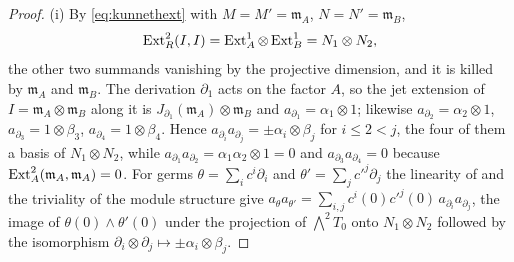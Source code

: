 \begin{proof}
(i) By \eqref{eq:kunnethext} with $M=M'=\mathfrak m_{A}$, $N=N'=\mathfrak m_{B}$,
\[
  \operatorname{Ext}^{2}_{R}(I,I)=\operatorname{Ext}^{1}_{A}\otimes\operatorname{Ext}^{1}_{B}=N_{1}\otimes N_{2},
\]
the other two summands vanishing by the projective dimension, and it is killed
by $\mathfrak m_{A}$ and $\mathfrak m_{B}$. The derivation $\partial_{1}$ acts on
the factor $A$, so the jet extension of $I=\mathfrak m_{A}\otimes\mathfrak m_{B}$
along it is $J_{\partial_{1}}(\mathfrak m_{A})\otimes\mathfrak m_{B}$ and
$a_{\partial_{1}}=\alpha_{1}\otimes1$; likewise $a_{\partial_{2}}=\alpha_{2}\otimes1$,
$a_{\partial_{3}}=1\otimes\beta_{3}$, $a_{\partial_{4}}=1\otimes\beta_{4}$.
Hence $a_{\partial_{i}}a_{\partial_{j}}=\pm\alpha_{i}\otimes\beta_{j}$ for
$i\le2<j$, the four of them a basis of $N_{1}\otimes N_{2}$, while
$a_{\partial_{1}}a_{\partial_{2}}=\alpha_{1}\alpha_{2}\otimes1=0$ and
$a_{\partial_{3}}a_{\partial_{4}}=0$ because $\operatorname{Ext}^{2}_{A}(\mathfrak m_{A},\mathfrak m_{A})=0$.
For germs $\theta=\sum_{i}c^{i}\partial_{i}$ and $\theta'=\sum_{j}c'^{j}\partial_{j}$
the linearity of  and the triviality of the module structure
give $a_{\theta}a_{\theta'}=\sum_{i,j}c^{i}(0)c'^{j}(0)\,a_{\partial_{i}}a_{\partial_{j}}$,
the image of $\theta(0)\wedge\theta'(0)$ under the projection of
$\bigwedge^{2}T_{0}$ onto $N_{1}\otimes N_{2}$ followed by the isomorphism
$\partial_{i}\otimes\partial_{j}\mapsto\pm\alpha_{i}\otimes\beta_{j}$.


\end{proof}
